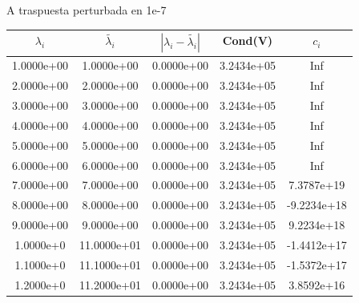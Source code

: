 \documentclass{article}
\begin{document}
\begin{itemize}
\begin{enumerate}[(a)]
\begin{figure}[h!]
\begin{tabular}{c|c|c|c|c}
\end{tabular}
\caption{A traspuesta perturbada en 1e-7}
\end{figure}
\begin{figure}[h!]
\centering
\begin{tabular}{c|c|c|c|c}
$\lambda_{i}$&$\tilde{\lambda_{i}}$ &$|\lambda_{i}-\tilde{\lambda_{i}}|$ &Cond(V) &$c_i$\\
\hline
1.0000e+00&1.0000e+00&0.0000e+00&3.2434e+05&Inf\\
\hline
2.0000e+00&2.0000e+00&0.0000e+00&3.2434e+05&Inf\\
\hline
3.0000e+00&3.0000e+00&0.0000e+00&3.2434e+05&Inf\\
\hline
4.0000e+00&4.0000e+00&0.0000e+00&3.2434e+05&Inf\\
\hline
5.0000e+00&5.0000e+00&0.0000e+00&3.2434e+05&Inf\\
\hline
6.0000e+00&6.0000e+00&0.0000e+00&3.2434e+05&Inf\\
\hline
7.0000e+00&7.0000e+00&0.0000e+00&3.2434e+05&7.3787e+19\\
\hline
8.0000e+00&8.0000e+00&0.0000e+00&3.2434e+05&-9.2234e+18\\
\hline
9.0000e+00&9.0000e+00&0.0000e+00&3.2434e+05&9.2234e+18\\
\hline
1.0000e+0&11.0000e+01&0.0000e+00&3.2434e+05&-1.4412e+17\\
\hline
1.1000e+0&11.1000e+01&0.0000e+00&3.2434e+05&-1.5372e+17\\
\hline
1.2000e+0&11.2000e+01&0.0000e+00&3.2434e+05&3.8592e+16\\
\hline


\end{tabular}
\end{figure}
\end{enumerate}
\end{itemize}
\end{document}
